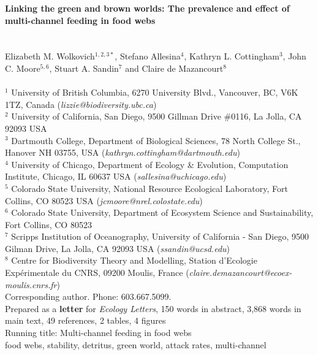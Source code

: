 \documentclass[12pt,a4paper,oneside]{article}
\begin{document}
{ \noindent \bf Linking the green and brown worlds: The prevalence and
 effect of multi-channel feeding in food webs}\\
\\
 \\
\noindent Elizabeth M. Wolkovich\(^{1,2,3*}\), Stefano Allesina\(^{4}\), Kathryn
L. Cottingham\(^{3}\), John C. Moore\(^{5,6}\), Stuart A. Sandin\(^{7}\) and Claire de
Mazancourt\(^{8}\)\\
\\
\noindent \(^{1}\) University of British Columbia, 6270 University Blvd., Vancouver, BC, V6K 1TZ, Canada (\emph{lizzie@biodiversity.ubc.ca})\\
\noindent \(^{2}\) University of California, San Diego, 9500 Gillman
Drive \#0116, La Jolla, CA 92093 USA\\
\noindent \(^{3}\) Dartmouth College, Department of Biological
Sciences, 78 North College St., Hanover NH 03755,
USA (\emph{kathryn.cottingham@dartmouth.edu})\\
\noindent \(^{4}\) University of Chicago, Department of Ecology \&
Evolution, Computation Institute, Chicago, IL 60637 USA (\emph{sallesina@uchicago.edu})\\ 
\noindent \(^{5}\) Colorado State University, National Resource Ecological Laboratory, Fort
Collins, CO 80523 USA \newline
(\emph{jcmoore@nrel.colostate.edu})\\ 
\noindent \(^{6}\) Colorado State University, Department of Ecosystem Science and Sustainability, Fort Collins, CO 80523\\
\noindent \(^{7}\) Scripps Institution of Oceanography, University of
California - San Diego, 9500 Gilman Drive, La Jolla, CA 92093 USA
(\emph{ssandin@ucsd.edu}) \\
\noindent \(^{8}\) Centre for Biodiversity Theory and Modelling, Station d'Ecologie Exp\'{e}rimentale du CNRS, 09200 Moulis, France 
(\emph{claire.demazancourt@ecoex-moulis.cnrs.fr})\\
\noindent * Corresponding author. Phone: 603.667.5099.
\\
\noindent Prepared as a {\bf letter} for \emph{Ecology Letters}, 150 words in abstract, 3,868 words in main text, 49 references, 2 tables, 4 figures\\

\noindent Running title: Multi-channel feeding in food webs\\ 

 food webs, stability, detritus, green world, attack
rates, multi-channel\\
\end{document}
